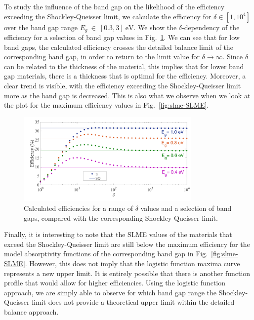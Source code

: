 \begin{refsection}
To study the influence of the band gap on the likelihood of the efficiency 
exceeding the Shockley-Queisser limit, we calculate the efficiency for $\delta 
\in [1, 10^4]$ over the band gap range $E_g~\in~[0.3, 3]~\si{\electronvolt}$. 
We show the $\delta$-dependency of the efficiency for a selection of band gap 
values in Fig.~\ref{fig:slme-deltadep}. We can see that for low band gaps, the 
calculated efficiency crosses the detailed balance limit of the corresponding 
band gap, in order to return to the limit value for $\delta \rightarrow 
\infty$. Since $\delta$ can be related to the thickness of the material, this 
implies that for lower band gap materials, there is a thickness that is 
optimal for the efficiency. Moreover, a clear trend is visible, with the 
efficiency exceeding the Shockley-Queisser limit more as the band gap is 
decreased. This is also what we observe when we look at the plot for the 
maximum efficiency values in Fig.~\ref{fig:slme-SLME}. 
 
\begin{figure}[h!] 
\centering 
\includegraphics[width=0.8\textwidth]{Figures/slme/sq_Fig3.png} 
\caption{Calculated efficiencies for a range of $\delta$ values and a 
selection of band gaps, compared with the corresponding Shockley-Queisser 
limit.} 
\label{fig:slme-deltadep} 
\end{figure} 
 
Finally, it is interesting to note that the SLME values of the materials that 
exceed the Shockley-Queisser limit are still below the maximum efficiency for 
the model absorptivity functions of the corresponding band gap in 
Fig.~\ref{fig:slme-SLME}. However, this does not imply that the logistic 
function maxima curve represents a new upper limit. It is entirely possible 
that there is another function profile that would allow for higher 
efficiencies. Using the logistic function approach, we are simply able to 
observe for which band gap range the Shockley-Queisser limit does not provide 
a theoretical upper limit within the detailed balance approach. 
 

\end{refsection}
